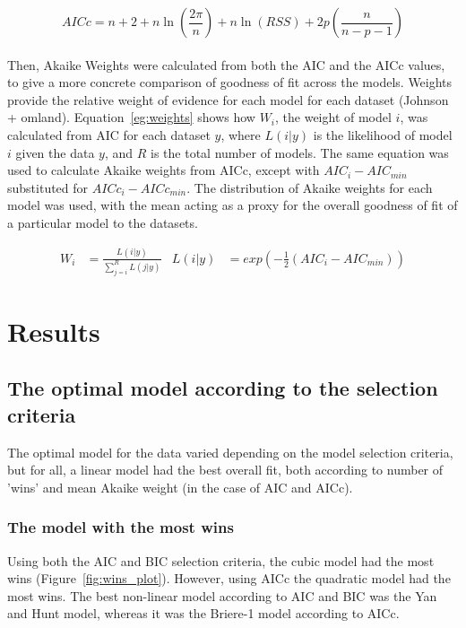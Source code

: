 \documentclass[11pt]{article}
\begin{document}
	\begin{equation} \label{eq:AICc}
	AICc = n + 2 + n\ln
		\left(
			\frac{2\pi}{n}								\right) 
	+ n\ln(RSS) + 2p 
		\left(
			\frac{n}{n - p - 1}
		\right)
	\end{equation}
	\\
	Then, Akaike Weights were calculated from both the AIC and the AICc values, to give a more concrete comparison of goodness of fit across the models. Weights provide the relative weight of evidence for each model for each dataset (Johnson + omland). Equation~\ref{eg:weights} shows how $W_i$, the weight of model $i$, was calculated from AIC for each dataset $y$, where $L(i | y)$ is the likelihood of model $i$ given the data $y$, and $R$ is the total number of models. The same equation was used to calculate Akaike weights from AICc, except with $AIC_i - AIC_{min}$ substituted for $AICc_i - AICc_{min}$. The distribution of Akaike weights for each model was used, with the mean acting as a proxy for the overall goodness of fit of a particular model to the datasets.
	
	\begin{align} \label{eg:weights}
	W_i &= \frac{L(i | y)}{\sum_{j = i}^{R}L(j | y) }
	& L(i | y) &= exp(-\frac{1}{2} (AIC_i - AIC_{min})) 
	\end{align}
	
\section{Results}

\subsection{The optimal model according to the selection criteria}
The optimal model for the data varied depending on the model selection criteria, but for all, a linear model had the best overall fit, both according to number of 'wins' and mean Akaike weight (in the case of AIC and AICc).

\subsubsection*{The model with the most wins}
Using both the AIC and BIC selection criteria, the cubic model had the most wins (Figure~\ref{fig:wins_plot}). However, using AICc the quadratic model had the most wins. The best non-linear model according to AIC and BIC was the Yan and Hunt model, whereas it was the Briere-1 model according to AICc.
\end{document}
